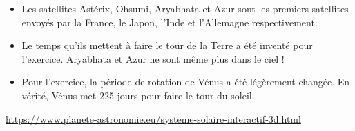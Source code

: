 \documentclass[a4paper,landscape,twocolumn]{article}
\begin{document}
\newpage

\begin{greybox}[frametitle={Point historique et scientifique}]
	\begin{itemize}
		\item Les satellites Astérix, Ohsumi, Aryabhata et Azur sont les premiers satellites envoyés par la France, le Japon, l'Inde et l'Allemagne respectivement.
		\item Le temps qu'ils mettent à faire le tour de la Terre a été inventé pour l'exercice. Aryabhata et Azur ne sont même plus dans le ciel !
		\item Pour l'exercice, la période de rotation de Vénus a été légèrement changée. En vérité, Vénus met 225 jours pour faire le tour du soleil.
	\end{itemize}
\end{greybox}

\begin{greybox}[frametitle={Pour jouer avec le système solaire}]
	\url{https://www.planete-astronomie.eu/systeme-solaire-interactif-3d.html}
\end{greybox}
\end{document}
